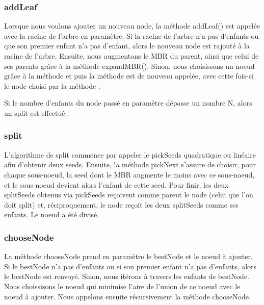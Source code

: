 \documentclass[utf8]{article}
\begin{document}
\begin{large}
  \subsubsection{addLeaf}\label{addLeaf}
  \indent
  \par
  Lorsque nous voulons ajouter un nouveau node, la méthode addLeaf() est appelée
  avec la racine de l'arbre en paramètre. Si la racine de l'arbre n'a pas
  d'enfants ou que son premier enfant n'a pas d'enfant, alors le nouveau node
  est rajouté à la racine de l'arbre. Ensuite, nous augmentons le MBR du parent,
  ainsi que celui de ses parents grâce à la méthode expandMBR(). Sinon, nous
  choisissons un noeud grâce à la méthode  et puis la méthode 
  est de nouveau appelée, avec cette fois-ci le node choisi par la méthode
  .
  \par
  \indent
  Si le nombre d'enfants du node passé en paramètre dépasse un nombre N, alors
  un split est effectué.
  \par
  \subsubsection{split}\label{split}
  \indent
  \par
  L'algorithme de split commence par appeler le pickSeeds quadratique ou
  linéaire afin d'obtenir deux seeds. \newline Ensuite, la
  méthode pickNext s'assure de choisir, pour chaque sous-noeud, la seed dont le
  MBR augmente le moins avec ce sous-noeud, et le sous-noeud devient alors
  l'enfant de cette seed. \newline Pour finir, les deux splitSeeds obtenus via
  pickSeeds reçoivent comme parent le node (celui que l'on doit split) et,
  réciproquement, le node reçoit les deux splitSeeds comme ses enfants. Le noeud
  a été divisé.
  \par

  \subsubsection{chooseNode}\label{chooseNode}
  \indent
  \par
  La méthode chooseNode prend en paramètre le bestNode et le noeud à ajouter.
  Si le bestNode n'a pas d'enfants ou si son premier enfant n'a pas d'enfants,
  alors le bestNode est renvoyé. Sinon, nous itérons à travers les enfants de
  bestNode. Nous choissisons le noeud qui minimise l'aire de l'union de ce noeud avec le noeud à ajouter. Nous appelons ensuite récursivement la méthode chooseNode.


\end{large}
\end{document}

